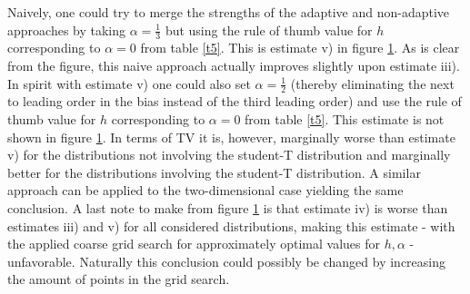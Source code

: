 \documentclass[
twoside,
openright,
titlepage,
numbers=noenddot,
headinclude,%
footinclude=true,
dottedtoc, %
ngerman,
american, %
pagesize=pdftex,
]{book}
\begin{document}
\begin{example}
\begin{figure}[H]
			\label{fig:r72}
		\end{figure}
		Naively, one could try to merge the strengths of the adaptive and non-adaptive approaches by taking $\alpha=\frac{1}{3}$ but using the rule of thumb value for $h$ corresponding to $\alpha=0$ from table \ref{t5}. This is estimate v) in figure \ref{fig:r72}. As is clear from the figure, this naive approach actually improves slightly upon estimate iii). In spirit with estimate v) one could also set $\alpha=\frac{1}{2}$ (thereby eliminating the next to leading order in the bias instead of the third leading order) and use the rule of thumb value for $h$ corresponding to $\alpha=0$ from table \ref{t5}. This estimate is not shown in figure \ref{fig:r72}. In terms of TV it is, however, marginally worse than estimate v) for the distributions not involving the student-T distribution and marginally better for the distributions involving the student-T distribution.	A similar approach can be applied to the two-dimensional case yielding the same conclusion.\newline
		A last note to make from figure \ref{fig:r72} is that estimate iv) is worse than estimates iii) and v) for all considered distributions, making this estimate - with the applied coarse grid search for approximately optimal values for $h,\alpha$ - unfavorable. Naturally this conclusion could possibly be changed by increasing the amount of points in the grid search. 
	\end{example}
	
\end{document}
